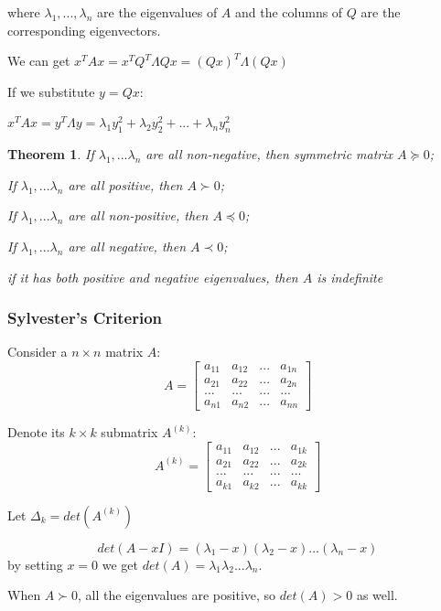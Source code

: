 \documentclass[11pt,a4paper]{article}
\newtheorem{theorem}{Theorem}
\begin{document}
where $\lambda_1, . . . , \lambda_n$ are the eigenvalues of $A$ and the columns of $Q$ are the corresponding eigenvectors.

    We can get $x^TAx=x^TQ^T\Lambda Qx=(Qx)^T\Lambda(Qx)$
    
    If we substitute $y=Qx$:
    
    $x^TAx=y^T\Lambda y=\lambda_1y_1^2+\lambda_2y_2^2+...+\lambda_ny_n^2$

\begin{theorem}
    \quad

    If $\lambda_1,...\lambda_n$ are all non-negative, then symmetric matrix $A\succeq 0$;
    
    If $\lambda_1,...\lambda_n$ are all positive, then $A\succ 0$;
    
    If $\lambda_1,...\lambda_n$ are all non-positive, then $A\preceq 0$;
    
    If $\lambda_1,...\lambda_n$ are all negative, then $A\prec 0$;
    
    if it has both positive and negative eigenvalues, then $A$ is indefinite
\end{theorem}

\subsubsection{Sylvester’s Criterion}

Consider a $n\times n$ matrix $A$: $$A=\begin{bmatrix}
    a_{11}&a_{12}&... &a_{1n}\\a_{21}&a_{22}&...&a_{2n}\\...&...&...&...\\a_{n1}&a_{n2}&...&a_{nn}
\end{bmatrix}$$

Denote its $k\times k$ submatrix $A^{(k)}$:
$$A^{(k)}=\begin{bmatrix}
    a_{11}&a_{12}&... &a_{1k}\\a_{21}&a_{22}&...&a_{2k}\\...&...&...&...\\a_{k1}&a_{k2}&...&a_{kk}
\end{bmatrix}$$

Let $\Delta_k=det(A^{(k)})$

$$det(A-xI)=(\lambda_1-x)(\lambda_2-x)...(\lambda_n-x)$$
by setting $x = 0$ we get $det(A) = \lambda_1\lambda_2...\lambda_n$.

When $A\succ 0$, all the eigenvalues are positive, so $det(A) > 0$ as well.
\end{document}
